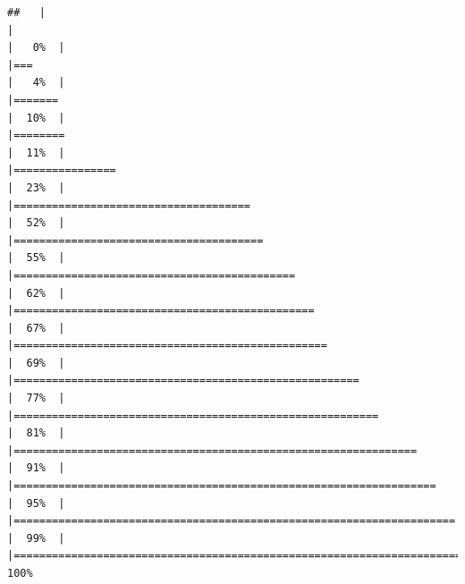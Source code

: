 \documentclass[
]{article}
\begin{document}
\begin{verbatim}
##   |                                                                              |                                                                      |   0%  |                                                                              |===                                                                   |   4%  |                                                                              |=======                                                               |  10%  |                                                                              |========                                                              |  11%  |                                                                              |================                                                      |  23%  |                                                                              |=====================================                                 |  52%  |                                                                              |=======================================                               |  55%  |                                                                              |============================================                          |  62%  |                                                                              |===============================================                       |  67%  |                                                                              |=================================================                     |  69%  |                                                                              |======================================================                |  77%  |                                                                              |=========================================================             |  81%  |                                                                              |===============================================================       |  91%  |                                                                              |==================================================================    |  95%  |                                                                              |===================================================================== |  99%  |                                                                              |======================================================================| 100%
\end{verbatim}
\end{document}
